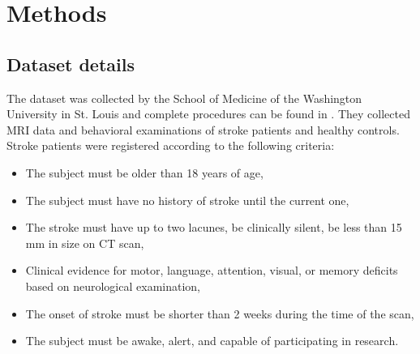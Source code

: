 \documentclass[fleqn,10pt]{wlscirep}
\begin{document}

\section*{Methods}
\subsection*{Dataset details}
The dataset was collected by the School of Medicine
of the Washington University in St. Louis and complete procedures can be found in \cite{corbetta2015common}. They collected MRI data and behavioral examinations of stroke patients and healthy controls. Stroke patients were registered according to the following criteria: 
\begin{itemize}
    \setlength\itemsep{0.005em}
    \item The subject must be older than 18 years of age,
    \item The subject must have no history of stroke until the current one,
    \item The stroke must have up to two lacunes, be clinically silent, be less than 15 mm in size on CT scan,
    \item Clinical evidence for motor, language, attention, visual, or memory deficits based on neurological examination,
    \item The onset of stroke must be shorter than 2 weeks during the time of the scan,
    \item The subject must be awake, alert, and capable of participating in research.
\end{itemize}
\end{document}
